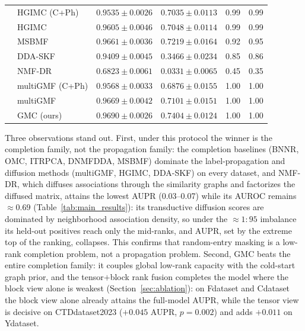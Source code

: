 \documentclass[webpdf,modern,large]{oup-authoring-template}
\begin{document}
\begin{table}[tb]
\begin{tabular}{llcccc}
& HGIMC (C+Ph) & $0.9535 \pm 0.0026$ & $0.7035 \pm 0.0113$ & 0.99 & 0.99 \\
& HGIMC & $0.9605 \pm 0.0046$ & $0.7048 \pm 0.0114$ & 0.99 & 0.99 \\
& MSBMF & $0.9661 \pm 0.0036$ & $0.7219 \pm 0.0164$ & 0.92 & 0.95 \\
& DDA-SKF & $0.9409 \pm 0.0045$ & $0.3466 \pm 0.0234$ & 0.85 & 0.86 \\
& NMF-DR & $0.6823 \pm 0.0061$ & $0.0331 \pm 0.0065$ & 0.45 & 0.35 \\
& multiGMF (C+Ph) & $0.9568 \pm 0.0033$ & $0.6876 \pm 0.0155$ & 1.00 & 1.00 \\
& multiGMF & $0.9669 \pm 0.0042$ & $0.7101 \pm 0.0151$ & 1.00 & 1.00 \\
& GMC (ours) & $0.9690 \pm 0.0026$ & \textbf{$0.7404 \pm 0.0124$} & 1.00 & 1.00 \\
\bottomrule
\end{tabular}
\end{table}

Three observations stand out. First, under this protocol the winner is the completion family, not the propagation family: the completion baselines (BNNR, OMC, ITRPCA, DNMFDDA, MSBMF) dominate the label-propagation and diffusion methods (multiGMF, HGIMC, DDA-SKF) on every dataset, and NMF-DR, which diffuses associations through the similarity graphs and factorizes the diffused matrix, attains the lowest AUPR (0.03--0.07) while its AUROC remains $\approx 0.69$ (Table~\ref{tab:main_results}): its transductive diffusion scores are dominated by neighborhood association density, so under the $\approx 1{:}95$ imbalance its held-out positives reach only the mid-ranks, and AUPR, set by the extreme top of the ranking, collapses. This confirms that random-entry masking is a low-rank completion problem, not a propagation problem. Second, GMC beats the entire completion family: it couples global low-rank capacity with the cold-start graph prior, and the tensor$+$block rank fusion completes the model where the block view alone is weakest (Section~\ref{sec:ablation}): on Fdataset and Cdataset the block view alone already attains the full-model AUPR, while the tensor view is decisive on CTDdataset2023 ($+0.045$ AUPR, $p=0.002$) and adds $+0.011$ on Ydataset.
\end{document}
